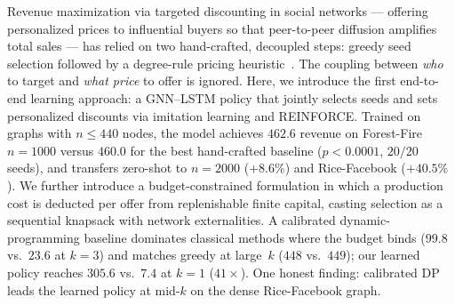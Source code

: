 %

Revenue maximization via targeted discounting in social networks — offering personalized
prices to influential buyers so that peer-to-peer diffusion amplifies total sales —
has relied on two hand-crafted, decoupled steps: greedy seed selection followed by a
degree-rule pricing heuristic~\citep{babaei2013revenue}.
The coupling between \emph{who} to target and \emph{what price} to offer is ignored.
Here, we introduce the first end-to-end learning approach: a GNN--LSTM policy that
jointly selects seeds and sets personalized discounts via imitation learning and
REINFORCE.
%
Trained on graphs with $n \le 440$ nodes, the model achieves
$462.6$ %
revenue on Forest-Fire $n{=}1000$ versus $460.0$ for the best hand-crafted baseline
($p{<}0.0001$, $20/20$ seeds),
and transfers zero-shot to $n{=}2000$ ($+8.6\%$) %
and Rice-Facebook ($+40.5\%$). %
%
We further introduce a budget-constrained formulation in which a production cost is
deducted per offer from replenishable finite capital, casting selection as a
sequential knapsack with network externalities.
A calibrated dynamic-programming baseline dominates classical methods where the
budget binds
($99.8$ vs.\ $23.6$ at $k{=}3$) %
and matches greedy at large~$k$ ($448$ vs.\ $449$); %
our learned policy reaches $305.6$ vs.\ $7.4$ at $k{=}1$ ($41{\times}$). %
One honest finding: calibrated DP leads the learned policy at mid-$k$ on the
dense Rice-Facebook graph.
